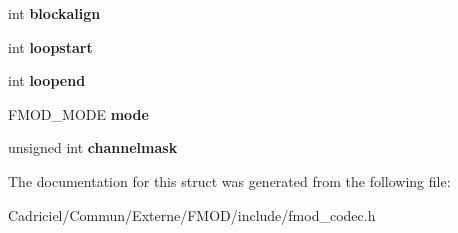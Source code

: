 \begin{DoxyCompactItemize}
\item 
\hypertarget{struct_f_m_o_d___c_o_d_e_c___w_a_v_e_f_o_r_m_a_t_a46df2a2789c6c438cd773762ed397a6f}{int {\bfseries blockalign}}\label{struct_f_m_o_d___c_o_d_e_c___w_a_v_e_f_o_r_m_a_t_a46df2a2789c6c438cd773762ed397a6f}

\item 
\hypertarget{struct_f_m_o_d___c_o_d_e_c___w_a_v_e_f_o_r_m_a_t_ae795e36327ba4772301f09501b2a8cc0}{int {\bfseries loopstart}}\label{struct_f_m_o_d___c_o_d_e_c___w_a_v_e_f_o_r_m_a_t_ae795e36327ba4772301f09501b2a8cc0}

\item 
\hypertarget{struct_f_m_o_d___c_o_d_e_c___w_a_v_e_f_o_r_m_a_t_af6fe45ead433ef4bdb8d3e74859900f2}{int {\bfseries loopend}}\label{struct_f_m_o_d___c_o_d_e_c___w_a_v_e_f_o_r_m_a_t_af6fe45ead433ef4bdb8d3e74859900f2}

\item 
\hypertarget{struct_f_m_o_d___c_o_d_e_c___w_a_v_e_f_o_r_m_a_t_a1f23ba212c380e08e9d0b83f16a00320}{F\-M\-O\-D\-\_\-\-M\-O\-D\-E {\bfseries mode}}\label{struct_f_m_o_d___c_o_d_e_c___w_a_v_e_f_o_r_m_a_t_a1f23ba212c380e08e9d0b83f16a00320}

\item 
\hypertarget{struct_f_m_o_d___c_o_d_e_c___w_a_v_e_f_o_r_m_a_t_aced974dac899dfe17cc5299453904281}{unsigned int {\bfseries channelmask}}\label{struct_f_m_o_d___c_o_d_e_c___w_a_v_e_f_o_r_m_a_t_aced974dac899dfe17cc5299453904281}

\end{DoxyCompactItemize}


The documentation for this struct was generated from the following file\-:\begin{DoxyCompactItemize}
\item 
Cadriciel/\-Commun/\-Externe/\-F\-M\-O\-D/include/fmod\-\_\-codec.\-h\end{DoxyCompactItemize}
